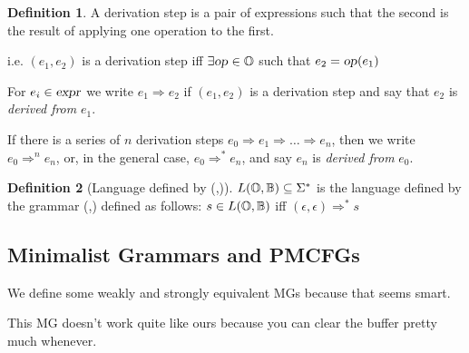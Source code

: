 \documentclass[12pt]{article}
\theoremstyle{definition}
\newtheorem{definition}{Definition}[section]
\begin{document}
\begin{definition}
  A derivation step is a pair of expressions such that the second is the result of applying one operation to the first.

  i.e.  $(e_1,e_2)$ is a derivation step iff $\exists \text{\textsl{op}}\in\mathbb{O}$ such that $e_2=\text{\textsl{op}}(e_1)$

  For $e_i\in\text{\textsl{expr}}$  we write $e_1 \Rightarrow e_2$ if $(e_1,e_2)$ is a derivation step and say that $e_2$ is \textit{derived from} $e_1$.

  If there is a series of $n$ derivation steps $e_0\Rightarrow e_1 \Rightarrow \dots \Rightarrow e_n$, then we write $e_0\Rightarrow^n e_n$, or, in the general case, $e_0\Rightarrow^* e_n$, and say  $e_n$ is \textit{derived from} $e_0$. 


\end{definition}

\begin{definition}[Language defined by (\OPS,\BIGR)]
$L(\mathbb{O},\mathbb{B})\subseteq\Sigma^*$ is the language defined by the grammar (\OPS,\BIGR) defined as follows:   $s\in L(\mathbb{O},\mathbb{B})$ iff $(\epsilon,\epsilon)\Rightarrow^*s$
\end{definition}


\subsection{Minimalist Grammars and PMCFGs}
\label{sec:minimalist-grammars}

We define some weakly and strongly equivalent MGs because that seems smart.

This MG doesn't work quite like ours because you can clear the buffer pretty much whenever.
\end{document}
